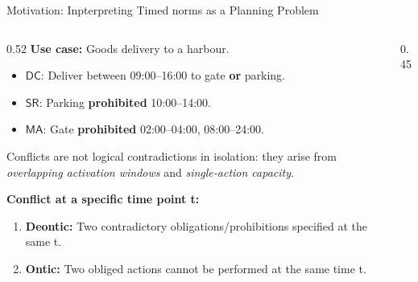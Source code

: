 \documentclass[9pt,aspectratio=169]{beamer}
\newcommand{\delAtGate}{\ensuremath{\mathsf{dag}}\xspace}
\newcommand{\DC}{\ensuremath{\mathsf{DC}}\xspace}
\newcommand{\SR}{\ensuremath{\mathsf{SR}}\xspace}
\newcommand{\MA}{\ensuremath{\mathsf{MA}}\xspace}
\begin{document}
\begin{frame}{Motivation: Inpterpreting Timed norms as a Planning Problem}
\begin{columns}[T]
  \begin{column}{0.52\textwidth}
    \small
    \textbf{Use case:} Goods delivery to a harbour.

    \begin{itemize}
      \item \DC: Deliver between 09:00--16:00 to gate \textbf{or} parking.
      \item \SR: Parking \textbf{prohibited} 10:00--14:00.
      \item \MA: Gate \textbf{prohibited} 02:00--04:00, 08:00--24:00.
    \end{itemize}


    Conflicts are not logical contradictions in isolation: they arise from \emph{overlapping activation windows} and \emph{single-action capacity}.

    \medskip
    \textbf{Conflict at a specific time point t:}
    \begin{enumerate}
      \item \textcolor{ConflictRed}{\textbf{Deontic:}} Two contradictory obligations/prohibitions specified at the same t.
      \item \textcolor{ConflictOrange}{\textbf{Ontic:}} Two obliged actions cannot be performed at the same time t.
    \end{enumerate}
  \end{column}
  \begin{column}{0.45\textwidth}
    \centering
\end{column}
\end{columns}
\end{frame}
\end{document}

